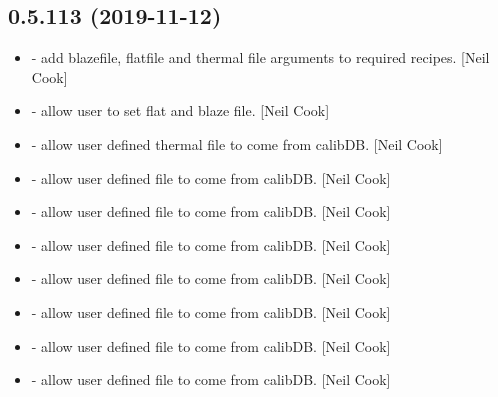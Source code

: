 \documentclass[a4paper,10pt,english]{report}
\begin{document}
\subsection{0.5.113 (2019-11-12)}
\label{\detokenize{misc/changelog:id29}}\begin{itemize}
\item {} 
 - add blazefile, flatfile
and thermal file arguments to required recipes. {[}Neil Cook{]}

\item {} 
 - allow user to set flat and blaze file.
{[}Neil Cook{]}

\item {} 
 - allow user defined thermal file to come from
calibDB. {[}Neil Cook{]}

\item {} 
 - allow user defined file to come from calibDB. {[}Neil
Cook{]}

\item {} 
 - allow user defined file to come from calibDB. {[}Neil
Cook{]}

\item {} 
 - allow user defined file to come from calibDB. {[}Neil
Cook{]}

\item {} 
 - allow user defined file to come from calibDB.
{[}Neil Cook{]}

\item {} 
 - allow user defined file to come from calibDB. {[}Neil
Cook{]}

\item {} 
 - allow user defined file to come from calibDB. {[}Neil
Cook{]}

\item {} 
 - allow user defined file to come from calibDB.
{[}Neil Cook{]}

\end{itemize}
\end{document}
